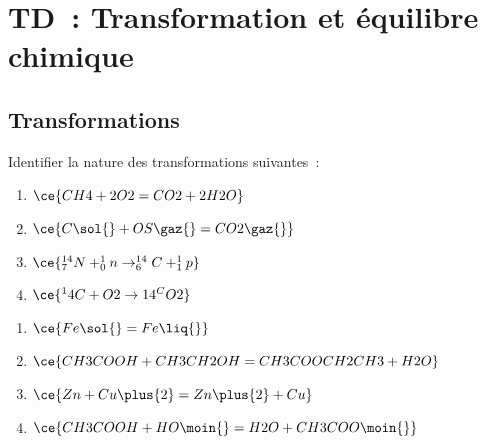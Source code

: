 \documentclass[a4paper, 12pt, final, garamond]{book}
\begin{document}
\setcounter{chapter}{1}

\chapter{TD~: Transformation et \'equilibre chimique}

\section{Transformations}
Identifier la nature des transformations suivantes~:\\

\begin{minipage}{0.40\linewidth}
    \begin{enumerate}
        \item $\ce{CH4 + 2O2 = CO2 + 2H2O}$
        \item $\ce{C\sol{} + OS\gaz{} = CO2\gaz{}}$
        \item $\ce{^{14}_{7}N + ^{1}_{0}n \rightarrow ^{14}_{6}C + ^1_1p}$
        \item $\ce{^14C + O2 \rightarrow 14^CO2}$
    \end{enumerate}
\end{minipage}
\hfill
\begin{minipage}{0.60\linewidth}
    \begin{enumerate}[start=5]
        \item $\ce{Fe\sol{} = Fe\liq{}}$
        \item $\ce{CH3COOH + CH3CH2OH = CH3COOCH2CH3 + H2O}$
        \item $\ce{Zn + Cu\plus{2} = Zn\plus{2} + Cu}$
        \item $\ce{CH3COOH + HO\moin{} = H2O + CH3COO\moin{}}$
    \end{enumerate}
\end{minipage}
\end{document}
